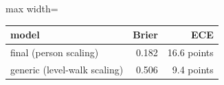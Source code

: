\begin{adjustbox}{max width=\textwidth}
{\footnotesize
\begin{tabular}{lrr}
\toprule
\textbf{model} & \textbf{Brier} & \textbf{ECE} \\
\midrule
final (person scaling) & 0.182 & 16.6 points \\
generic (level-walk scaling) & 0.506 & 9.4 points \\
\bottomrule
\end{tabular}
}
\end{adjustbox}
